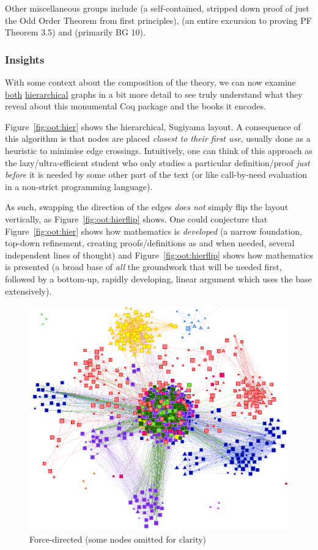 Other miscellaneous groups include  (a self-contained,
stripped down proof of just the Odd Order Theorem from first principles),
 (an entire excursion to proving PF Theorem 3.5) and
 (primarily BG 10).

\subsubsection{Insights}

With some context about the composition of the theory, we can now examine
\hyperref[fig:oot:hier]{both} \hyperref[fig:oot:hierflip]{hierarchical} graphs
in a bit more detail to see truly understand what they reveal about this
monumental Coq package and the books it encodes.

Figure~\ref{fig:oot:hier} shows the hierarchical, Sugiyama layout.  A
consequence of this algorithm is that nodes are placed \emph{closest to their
first use}, usually done as a heuristic to minimise edge crossings. Intuitively,
one can think of this approach as the lazy/ultra-efficient student who only
studies a particular definition/proof \emph{just before} it is needed by some
other part of the text (or like call-by-need evaluation in a non-strict
programming language).

As such, swapping the direction of the edges \emph{does not} simply flip the
layout vertically, as Figure~\ref{fig:oot:hierflip} shows. One could conjecture
that Figure~\ref{fig:oot:hier} shows how mathematics is \emph{developed} (a
narrow foundation, top-down refinement, creating proofs/definitions as and when
needed, several independent lines of thought) and Figure~\ref{fig:oot:hierflip}
shows how mathematics is presented (a broad base of \emph{all} the groundwork
that will be needed first, followed by a bottom-up, rapidly developing, linear
argument which uses the base extensively).

\begin{figure}[p]
\centering
\includegraphics[height=0.45\textheight]{img/oot/direct}
\caption{Force-directed (some nodes omitted for clarity)}\label{fig:oot:direct}
\end{figure}

